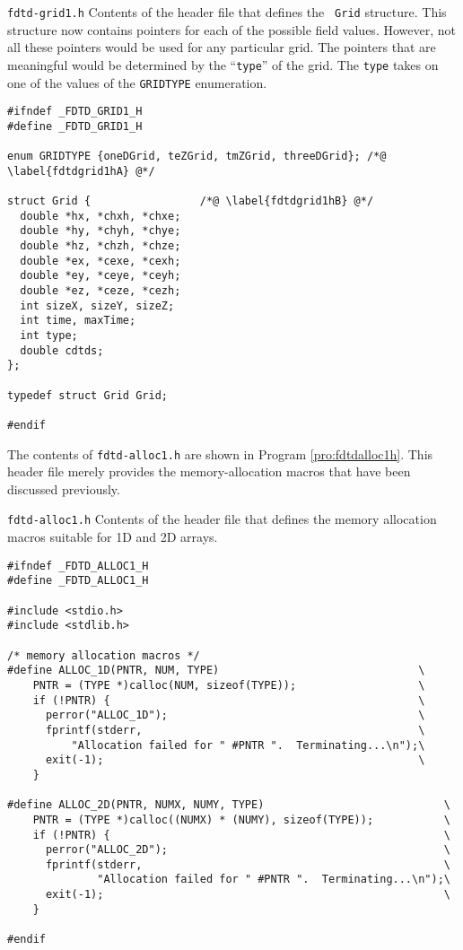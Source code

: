 \begin{program}
{\tt fdtd-grid1.h}  Contents of the header file that defines the {\tt
Grid} structure.  This structure now contains pointers for each of the
possible field values.  However, not all these pointers would be used
for any particular grid.  The pointers that are meaningful would be
determined by the ``{\tt type}'' of the grid.  The {\tt type} takes on
one of the values of the {\tt GRIDTYPE} enumeration.
\label{pro:fdtdgrid1h}
\codemiddle
\begin{lstlisting}
#ifndef _FDTD_GRID1_H
#define _FDTD_GRID1_H

enum GRIDTYPE {oneDGrid, teZGrid, tmZGrid, threeDGrid}; /*@ \label{fdtdgrid1hA} @*/

struct Grid {                 /*@ \label{fdtdgrid1hB} @*/
  double *hx, *chxh, *chxe;
  double *hy, *chyh, *chye;
  double *hz, *chzh, *chze;
  double *ex, *cexe, *cexh;
  double *ey, *ceye, *ceyh;
  double *ez, *ceze, *cezh;
  int sizeX, sizeY, sizeZ;
  int time, maxTime;
  int type;
  double cdtds;
};

typedef struct Grid Grid;

#endif
\end{lstlisting}
\end{program}

The contents of {\tt fdtd-alloc1.h} are shown in Program
\ref{pro:fdtdalloc1h}.  This header file merely provides the
memory-allocation macros that have been discussed previously.

\begin{program}
{\tt fdtd-alloc1.h} Contents of the header file that defines the
memory allocation macros suitable for 1D and 2D arrays.
\label{pro:fdtdalloc1h}
\codemiddle
\begin{lstlisting}
#ifndef _FDTD_ALLOC1_H
#define _FDTD_ALLOC1_H

#include <stdio.h>
#include <stdlib.h>

/* memory allocation macros */
#define ALLOC_1D(PNTR, NUM, TYPE)                               \
    PNTR = (TYPE *)calloc(NUM, sizeof(TYPE));                   \
    if (!PNTR) {                                                \
      perror("ALLOC_1D");                                       \
      fprintf(stderr,                                           \
          "Allocation failed for " #PNTR ".  Terminating...\n");\
      exit(-1);                                                 \
    }

#define ALLOC_2D(PNTR, NUMX, NUMY, TYPE)                            \
    PNTR = (TYPE *)calloc((NUMX) * (NUMY), sizeof(TYPE));           \
    if (!PNTR) {                                                    \
      perror("ALLOC_2D");                                           \
      fprintf(stderr,                                               \
              "Allocation failed for " #PNTR ".  Terminating...\n");\
      exit(-1);                                                     \
    }

#endif
\end{lstlisting}
\end{program}

